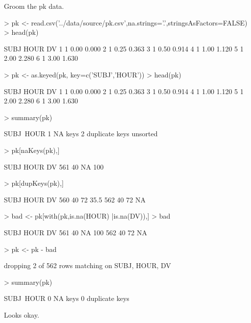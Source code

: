 Groom the pk data.
\begin{Schunk}
\begin{Sinput}
> pk   <- read.csv('../data/source/pk.csv',na.strings='.',stringsAsFactors=FALSE)
> head(pk)
\end{Sinput}
\begin{Soutput}
  SUBJ HOUR    DV
1    1 0.00 0.000
2    1 0.25 0.363
3    1 0.50 0.914
4    1 1.00 1.120
5    1 2.00 2.280
6    1 3.00 1.630
\end{Soutput}
\begin{Sinput}
> pk <- as.keyed(pk, key=c('SUBJ','HOUR'))
> head(pk)
\end{Sinput}
\begin{Soutput}
  SUBJ HOUR    DV
1    1 0.00 0.000
2    1 0.25 0.363
3    1 0.50 0.914
4    1 1.00 1.120
5    1 2.00 2.280
6    1 3.00 1.630
\end{Soutput}
\begin{Sinput}
> summary(pk)
\end{Sinput}
\begin{Soutput}
SUBJ~HOUR
1 NA keys
2 duplicate keys
unsorted
\end{Soutput}
\begin{Sinput}
> pk[naKeys(pk),]
\end{Sinput}
\begin{Soutput}
    SUBJ HOUR  DV
561   40   NA 100
\end{Soutput}
\begin{Sinput}
> pk[dupKeys(pk),]
\end{Sinput}
\begin{Soutput}
    SUBJ HOUR   DV
560   40   72 35.5
562   40   72   NA
\end{Soutput}
\begin{Sinput}
> bad <- pk[with(pk,is.na(HOUR) |is.na(DV)),]
> bad
\end{Sinput}
\begin{Soutput}
    SUBJ HOUR  DV
561   40   NA 100
562   40   72  NA
\end{Soutput}
\begin{Sinput}
> pk <- pk - bad
\end{Sinput}
\begin{Soutput}
dropping 2 of 562 rows matching on SUBJ, HOUR, DV
\end{Soutput}
\begin{Sinput}
> summary(pk)
\end{Sinput}
\begin{Soutput}
SUBJ~HOUR
0 NA keys
0 duplicate keys
\end{Soutput}
\end{Schunk}
Looks okay.  

